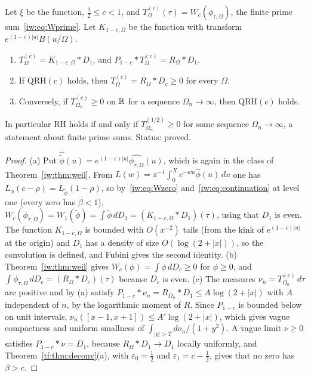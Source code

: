 \begin{proposition}\label{iw:prop:jackson}
Let $\xi$ be the function, $\tfrac12\le c<1$, and $T^{(c)}_\Omega(\tau)=W_c(\phi_{\tau,\Omega})$, the finite prime sum~\eqref{iw:eq:Wprime}. Let $K_{1-c,\Omega}$ be the function with transform $e^{(1-c)|u|}B(u/\Omega)$.
\begin{enumerate}
\item[(a)] $T^{(c)}_\Omega=K_{1-c,\Omega}*D_1$, and $P_{1-c}*T^{(c)}_\Omega=R_\Omega*D_1$.
\item[(b)] If $\mathrm{QRH}(c)$ holds, then $T^{(c)}_\Omega=R_\Omega*D_c\ge0$ for every $\Omega$.
\item[(c)] Conversely, if $T^{(c)}_{\Omega_n}\ge0$ on $\mathbb{R}$ for a sequence $\Omega_n\to\infty$, then $\mathrm{QRH}(c)$ holds.
\end{enumerate}
In particular RH holds if and only if $T^{(1/2)}_{\Omega_n}\ge0$ for some sequence $\Omega_n\to\infty$, a statement about finite prime sums. Status: proved.
\end{proposition}

\begin{proof}
(a) Put $\widehat{\tilde\phi}(u)=e^{(1-c)|u|}\widehat{\phi_{\tau,\Omega}}(u)$, which is again in the class of Theorem~\ref{iw:thm:weil}. From $L(w)=\pi^{-1}\int_0^Xe^{-wu}\widehat\phi(u)\,du$ one has $L_\phi(c-\rho)=L_{\tilde\phi}(1-\rho)$, so by~\eqref{iw:eq:Wzero} and~\eqref{iw:eq:continuation} at level one (every zero has $\beta<1$), $W_c(\phi_{\tau,\Omega})=W_1(\tilde\phi)=\int\tilde\phi\,dD_1=(K_{1-c,\Omega}*D_1)(\tau)$, using that $D_1$ is even. The function $K_{1-c,\Omega}$ is bounded with $O(x^{-2})$ tails (from the kink of $e^{(1-c)|u|}$ at the origin) and $D_1$ has a density of size $O(\log(2+|x|))$, so the convolution is defined, and Fubini gives the second identity.
(b) Theorem~\ref{iw:thm:weil} gives $W_c(\phi)=\int\phi\,dD_c\ge0$ for $\phi\ge0$, and $\int\phi_{\tau,\Omega}\,dD_c=(R_\Omega*D_c)(\tau)$ because $D_c$ is even.
(c) The measures $\nu_n=T^{(c)}_{\Omega_n}\,d\tau$ are positive and by (a) satisfy $P_{1-c}*\nu_n=R_{\Omega_n}*D_1\le A\log(2+|x|)$ with $A$ independent of $n$, by the logarithmic moment of $R$. Since $P_{1-c}$ is bounded below on unit intervals, $\nu_n([x-1,x+1])\le A'\log(2+|x|)$, which gives vague compactness and uniform smallness of $\int_{|y|>T}d\nu_n/(1+y^2)$. A vague limit $\nu\ge0$ satisfies $P_{1-c}*\nu=D_1$, because $R_{\Omega}*D_1\to D_1$ locally uniformly, and Theorem~\ref{tf:thm:deconv}(a), with $\varepsilon_0=\tfrac12$ and $\varepsilon_1=c-\tfrac12$, gives that no zero has $\beta>c$.
\end{proof}

